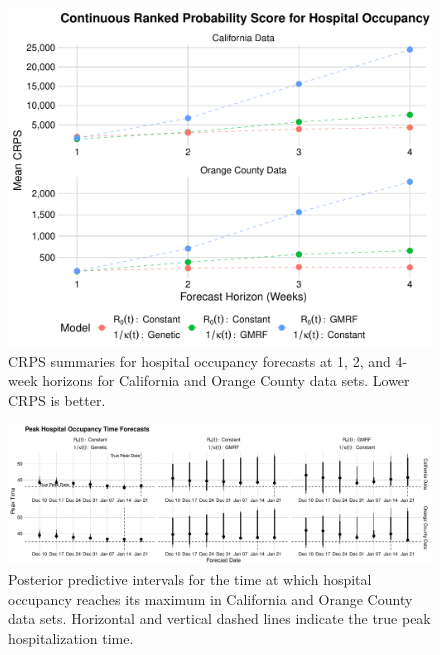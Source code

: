 \begin{figure}
    \centering
    \includegraphics[width=1.0\columnwidth]{real_data_crps_comparison_dotplot_data_hospitalizations_plot}
    \caption[CRPS summaries for hospital occupancy forecasts for real data sets.]{CRPS summaries for hospital occupancy forecasts at 1, 2, and 4-week horizons for California and Orange County data sets. Lower CRPS is better.}
    \label{ch_5:fig:real_data_crps_comparison_dotplot_data_hospitalizations_plot}
\end{figure}

\begin{figure}
    \centering
    \includegraphics[width=1.0\columnwidth]{real_data_peak_assessment_time_plot}
    \caption[Posterior predictive intervals for peak hospital occupancy timing for real data sets.]{Posterior predictive intervals for the time at which hospital occupancy reaches its maximum in California and Orange County data sets.
    Horizontal and vertical dashed lines indicate the true peak hospitalization time.}
    \label{ch_5:fig:real_data_peak_assessment_time_plot}
\end{figure}

